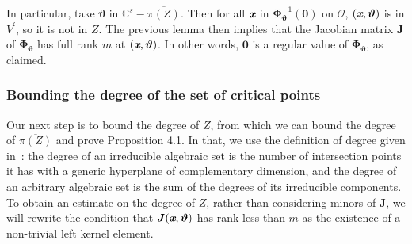 \documentclass[a4paper]{article}
\def\sO{\mathscr{O}}
\def\thetab{\bm{\vartheta}}
\def\xb{\textit{\textbf{x}}}
\def\dt{s}
\def\C{\mathbb{C}}
\begin{document}
    In particular, take $\thetab$ in $\C^\dt - \overline{\pi(Z)}$.
    Then for all $\xb$ in $\bm \Phi_{\thetab}^{-1}(\bm 0)$ on $\sO$, $(\xb,\thetab)$
    is in $V^{'}$, so it is not in $Z$. The previous lemma then implies that
    the Jacobian matrix $\bm J$ of $\bm\Phi_{\thetab}$ has full rank $m$ at
    $(\xb,\thetab)$. In other words, $\bm 0$ is a regular value of $\bm
    \Phi_{\thetab}$, as claimed.
    
    
    
    \subsubsection{Bounding the degree of the set of critical points}
    Our next step is to bound the degree of $Z$, from which we can bound the degree of $\overline{\pi(Z)}$ and prove Proposition 4.1.  In that, we use the
    definition of degree given in~\cite{H}: the degree of an irreducible
    algebraic set is the number of intersection points it has with a
    generic hyperplane of complementary dimension, and the degree of an
    arbitrary algebraic set is the sum of the degrees of its irreducible
    components.  To obtain an estimate on the degree of $Z$, rather than
    considering minors of $\bm J$, we will rewrite the condition that $\bm
    J(\xb,\thetab)$ has rank less than $m$ as the existence of a
    non-trivial left kernel element.
    
\end{document}
